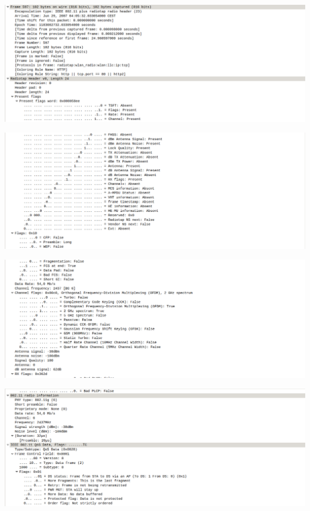 \documentclass{article}
\begin{document}
\begin{center}
\includegraphics[scale=0.3]{WLAN/tcpreq1.png}
\end{center}
\begin{center}
\includegraphics[scale=0.3]{WLAN/tcpreq2.png}
\end{center}
\begin{center}
\includegraphics[scale=0.3]{WLAN/tcpreq3.png}
\end{center}
\begin{center}
\includegraphics[scale=0.3]{WLAN/tcpreq4.png}
\end{center}
\end{document}
